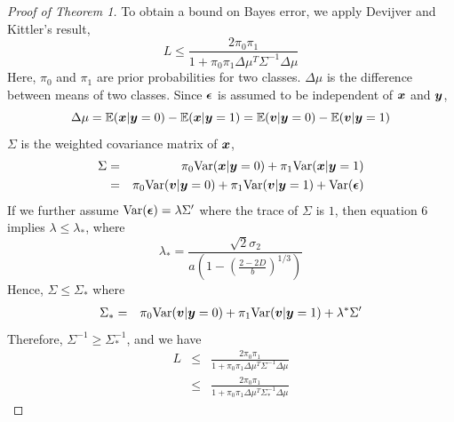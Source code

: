 \documentclass{article}
\begin{document}
\begin{proof}[Proof of Theorem 1]
	To obtain a bound on Bayes error, we apply Devijver and Kittler's result,
	\[L \leq \frac{2\pi_0\pi_1}{1+\pi_0\pi_1\Delta\mu^T\Sigma^{-1}\Delta\mu}\]
	Here, $\pi_0$ and $\pi_1$ are prior probabilities for two classes. $\Delta\mu$ is the difference between means of two classes. Since $\boldsymbol{\epsilon}$ is assumed to be independent of $\boldsymbol{x}$ and $\boldsymbol{y}$,
	\[\Delta\mu= \mathbb{E}(\boldsymbol{x}|\boldsymbol{y}=0)-\mathbb{E}(\boldsymbol{x}|\boldsymbol{y}=1)=\mathbb{E}(\boldsymbol{v}|\boldsymbol{y}=0)-\mathbb{E}(\boldsymbol{v}|\boldsymbol{y}=1)\]
	$\Sigma$ is the weighted covariance matrix of $\boldsymbol{x}$,
	\begin{eqnarray*}
		\Sigma &=& \pi_0\text{Var}(\boldsymbol{x}|\boldsymbol{y}=0)+\pi_1\text{Var}(\boldsymbol{x}|\boldsymbol{y}=1)\\
		&=& \pi_0\text{Var}(\boldsymbol{v}|\boldsymbol{y}=0)+\pi_1\text{Var}(\boldsymbol{v}|\boldsymbol{y}=1)+\text{Var}(\boldsymbol{\epsilon}) \\ 
	\end{eqnarray*}
	If we further assume $\text{Var}(\boldsymbol{\epsilon}) = \lambda \Sigma'$ where the trace of $\Sigma$ is $1$, then equation 6 implies $\lambda\leq\lambda_*$, where
	\[\lambda_*=\frac{\sqrt{2}\sigma_2}{a(1-(\frac{2-2D}{b})^{1/3} )}\]
	Hence, 	$\Sigma \leq \Sigma_*$ where
	\begin{eqnarray*}
		\Sigma_*&=& \pi_0\text{Var}(\boldsymbol{v}|\boldsymbol{y}=0)+\pi_1\text{Var}(\boldsymbol{v}|\boldsymbol{y}=1)+\lambda^*\Sigma'
	\end{eqnarray*}
	Therefore, $\Sigma^{-1} \geq \Sigma_*^{-1}$, and we have
	\begin{eqnarray*}
		L &\leq& \frac{2\pi_0\pi_1}{1+\pi_0\pi_1\Delta\mu^T\Sigma^{-1}\Delta\mu} \\
		&\leq& \frac{2\pi_0\pi_1}{1+\pi_0\pi_1\Delta\mu^T\Sigma_*^{-1}\Delta\mu}
	\end{eqnarray*}
\end{proof}
\end{document}
